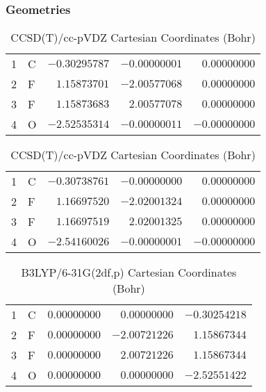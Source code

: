 \documentclass[10pt,oneside]{article}
\begin{document}
\clearpage

\subsection{}

\begin{table}[h!]
\subsubsection*{Geometries}
\begin{multicols}{2}
\centering
\caption{CCSD(T)/cc-pVTZ Cartesian Coordinates (Bohr)}
\begin{tabular}{llrrr}
\toprule
1  & C  & $-0.30295787$ & $-0.00000001$ & $ 0.00000000$ \\
2  & F  & $ 1.15873701$ & $-2.00577068$ & $ 0.00000000$ \\
3  & F  & $ 1.15873683$ & $ 2.00577078$ & $ 0.00000000$ \\
4  & O  & $-2.52535314$ & $-0.00000011$ & $-0.00000000$ \\
\bottomrule
\end{tabular}
\caption{CCSD(T)/cc-pVDZ Cartesian Coordinates (Bohr)}
\begin{tabular}{llrrr}
\toprule
1  & C  & $-0.30738761$ & $-0.00000000$ & $ 0.00000000$ \\
2  & F  & $ 1.16697520$ & $-2.02001324$ & $ 0.00000000$ \\
3  & F  & $ 1.16697519$ & $ 2.02001325$ & $ 0.00000000$ \\
4  & O  & $-2.54160026$ & $-0.00000001$ & $-0.00000000$ \\
\bottomrule
\end{tabular}
\end{multicols}
\end{table}

\begin{table}[h]
\centering
\caption{B3LYP/6-31G(2df,p) Cartesian Coordinates (Bohr)}
\begin{tabular}{llrrr}
\toprule
1  & C  & $ 0.00000000$ & $ 0.00000000$ & $-0.30254218$ \\
2  & F  & $ 0.00000000$ & $-2.00721226$ & $ 1.15867344$ \\
3  & F  & $ 0.00000000$ & $ 2.00721226$ & $ 1.15867344$ \\
4  & O  & $ 0.00000000$ & $ 0.00000000$ & $-2.52551422$ \\
\bottomrule
\end{tabular}
\end{table}
\end{document}
